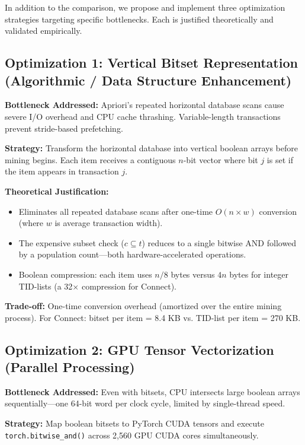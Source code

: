 \documentclass[conference]{IEEEtran}
\begin{document}
In addition to the comparison, we propose and implement three optimization strategies targeting specific bottlenecks. Each is justified theoretically and validated empirically.

\subsection{Optimization 1: Vertical Bitset Representation (Algorithmic / Data Structure Enhancement)}

\textbf{Bottleneck Addressed:} Apriori's repeated horizontal database scans cause severe I/O overhead and CPU cache thrashing. Variable-length transactions prevent stride-based prefetching.

\textbf{Strategy:} Transform the horizontal database into vertical boolean arrays before mining begins. Each item receives a contiguous $n$-bit vector where bit $j$ is set if the item appears in transaction $j$.

\textbf{Theoretical Justification:}
\begin{itemize}
    \item Eliminates all repeated database scans after one-time $O(n \times w)$ conversion (where $w$ is average transaction width).
    \item The expensive subset check ($c \subseteq t$) reduces to a single bitwise AND followed by a population count---both hardware-accelerated operations.
    \item Boolean compression: each item uses $n/8$ bytes versus $4n$ bytes for integer TID-lists (a 32$\times$ compression for Connect).
\end{itemize}

\textbf{Trade-off:} One-time conversion overhead (amortized over the entire mining process). For Connect: bitset per item = 8.4 KB vs. TID-list per item = 270 KB.

\subsection{Optimization 2: GPU Tensor Vectorization (Parallel Processing)}

\textbf{Bottleneck Addressed:} Even with bitsets, CPU intersects large boolean arrays sequentially---one 64-bit word per clock cycle, limited by single-thread speed.

\textbf{Strategy:} Map boolean bitsets to PyTorch CUDA tensors and execute \texttt{torch.bitwise\_and()} across 2,560 GPU CUDA cores simultaneously.
\end{document}
